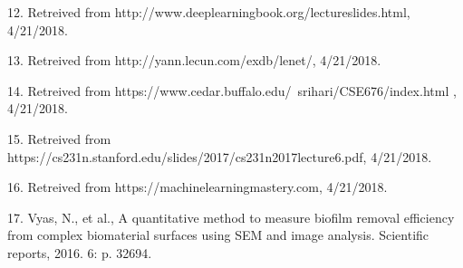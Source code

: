 \documentclass{article}
\begin{document}
12.	Retreived from http://www.deeplearningbook.org/lectureslides.html,  4/21/2018.

13.	Retreived from http://yann.lecun.com/exdb/lenet/,  4/21/2018.

14.	Retreived from https://www.cedar.buffalo.edu/~srihari/CSE676/index.html , 4/21/2018.

15.	Retreived from https://cs231n.stanford.edu/slides/2017/cs231n2017lecture6.pdf,  4/21/2018.

16.	Retreived from https://machinelearningmastery.com,  4/21/2018.

17.	Vyas, N., et al., A quantitative method to measure biofilm removal efficiency from complex biomaterial surfaces using SEM and image analysis. Scientific reports, 2016. 6: p. 32694.

  
\end{document}
